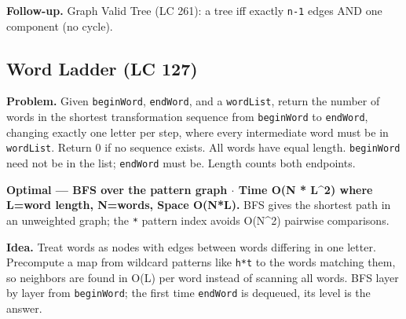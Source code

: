 \documentclass[11pt]{article}
\begin{document}
\textbf{Follow-up.} Graph Valid Tree (LC 261): a tree iff exactly \texttt{n-1} edges AND one component (no cycle).

\subsection{Word Ladder (LC 127)}\label{word-ladder-lc-127}

\textbf{Problem.} Given \texttt{beginWord}, \texttt{endWord}, and a \texttt{wordList}, return the number of words in the shortest transformation sequence from \texttt{beginWord} to \texttt{endWord}, changing exactly one letter per step, where every intermediate word must be in \texttt{wordList}. Return 0 if no sequence exists. All words have equal length. \texttt{beginWord} need not be in the list; \texttt{endWord} must be. Length counts both endpoints.

\textbf{Optimal --- BFS over the pattern graph \(\cdot\) Time O(N * L\^{}2) where L=word length, N=words, Space O(N*L).} BFS gives the shortest path in an unweighted graph; the \texttt{*} pattern index avoids O(N\^{}2) pairwise comparisons.

\textbf{Idea.} Treat words as nodes with edges between words differing in one letter. Precompute a map from wildcard patterns like \texttt{h*t} to the words matching them, so neighbors are found in O(L) per word instead of scanning all words. BFS layer by layer from \texttt{beginWord}; the first time \texttt{endWord} is dequeued, its level is the answer.

\end{document}

